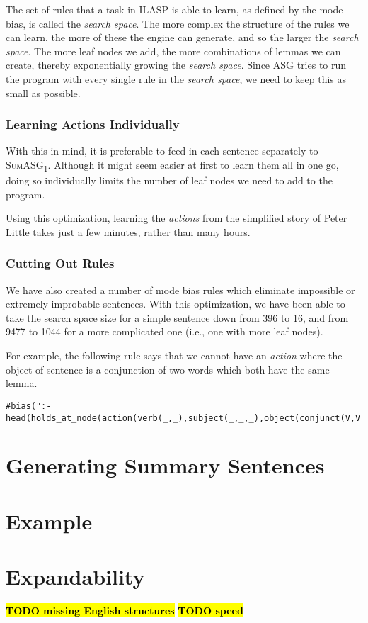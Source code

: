 The set of rules that a task in ILASP is able to learn, as defined by the mode bias, is called the \textit{search space}. The more complex the structure of the rules we can learn, the more of these the engine can generate, and so the larger the \textit{search space}. The more leaf nodes we add, the more combinations of lemmas we can create, thereby exponentially growing the \textit{search space}. Since ASG tries to run the program with every single rule in the \textit{search space}, we need to keep this as small as possible.

\subsubsection{Learning Actions Individually}

With this in mind, it is preferable to feed in each sentence separately to \textsc{SumASG\textsubscript{1}}. Although it might seem easier at first to learn them all in one go, doing so individually limits the number of leaf nodes we need to add to the program.

Using this optimization, learning the \textit{actions} from the simplified story of Peter Little takes just a few minutes, rather than many hours.

\subsubsection{Cutting Out Rules}

We have also created a number of mode bias rules which eliminate impossible or extremely improbable sentences. With this optimization, we have been able to take the search space size for a simple sentence down from 396 to 16, and from 9477 to 1044 for a more complicated one (i.e., one with more leaf nodes).

For example, the following rule says that we cannot have an \textit{action} where the object of sentence is a conjunction of two words which both have the same lemma.

\begin{displayquote}
\begin{lstlisting}
#bias(":- head(holds_at_node(action(verb(_,_),subject(_,_,_),object(conjunct(V,V),_,_)),var__(1))).").
\end{lstlisting}
\end{displayquote}

\section{Generating Summary Sentences}

\section{Example}

\section{Expandability}

\textcolor{red}{\textbf{\hl{TODO missing English structures}}}
\textcolor{red}{\textbf{\hl{TODO speed}}}